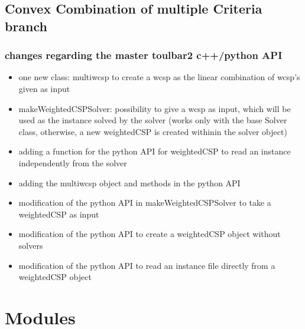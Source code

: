 \documentclass[letterpaper,10pt,openany,oneside,english]{sphinxmanual}
\begin{document}
\section{Convex Combination of multiple Criteria branch}
\label{\detokenize{_files/README:convex-combination-of-multiple-criteria-branch}}\label{\detokenize{_files/README:readme-6}}

\subsection{changes regarding the master toulbar2 c++/python API}
\label{\detokenize{_files/README:changes-regarding-the-master-toulbar2-c-python-api}}\begin{itemize}
\item {} 
\sphinxAtStartPar
one new class: multiwcsp to create a wcsp as the linear combination of wcsp’s given as input

\item {} 
\sphinxAtStartPar
makeWeightedCSPSolver: possibility to give a wcsp as input, which will be used as the instance solved by the solver (works only with the base Solver class, otherwise, a new weightedCSP is created withinin the solver object)

\item {} 
\sphinxAtStartPar
adding a function for the python API for weightedCSP to read an instance independently from the solver

\item {} 
\sphinxAtStartPar
adding the multiwcsp object and methods in the python API

\item {} 
\sphinxAtStartPar
modification of the python API in makeWeightedCSPSolver to take a weightedCSP as input

\item {} 
\sphinxAtStartPar
modification of the python API to create a weightedCSP object without solvers

\item {} 
\sphinxAtStartPar
modification of the python API to read an instance file directly from a weightedCSP object

\end{itemize}

\sphinxstepscope


\chapter{Modules}
\label{\detokenize{ref/ref_modules:modules}}\label{\detokenize{ref/ref_modules:ref-modules}}\label{\detokenize{ref/ref_modules::doc}}
\end{document}
